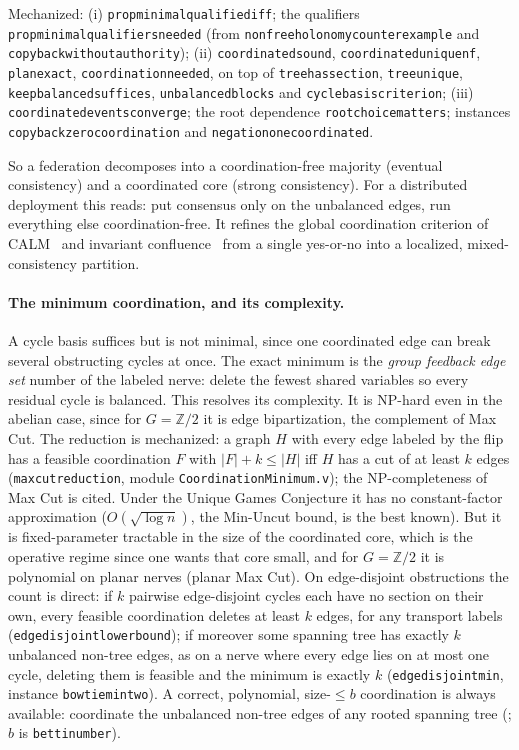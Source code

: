 \documentclass[11pt,a4paper]{article}
\theoremstyle{plain}
\theoremstyle{definition}
\theoremstyle{remark}
\renewcommand{\_}{\origunderscore\allowbreak}
\begin{document}
\noindent Mechanized: (i) \texttt{prop\_minimal\_qualified\_iff}; the qualifiers
\texttt{prop\_minimal\_qualifiers\_needed} (from \texttt{nonfree\_holonomy\_counterexample} and
\texttt{copyback\_without\_authority}); (ii) \texttt{coordinated\_sound},
\texttt{coordinated\_unique\_nf}, \texttt{plan\_exact}, \texttt{coordination\_needed}, on top of
\texttt{tree\_has\_section}, \texttt{tree\_unique}, \texttt{keep\_balanced\_suffices},
\texttt{unbalanced\_blocks} and \texttt{cycle\_basis\_criterion}; (iii)
\texttt{coordinated\_events\_converge}; the root dependence \texttt{root\_choice\_matters}; instances
\texttt{copyback\_zero\_coordination} and \texttt{negation\_one\_coordinated}.

So a federation decomposes into a coordination-free majority (eventual consistency) and a coordinated
core (strong consistency). For a distributed deployment this reads: put consensus only on the
unbalanced edges, run everything else coordination-free. It refines the global coordination criterion
of CALM~\cite{hellerstein2010declarative, ameloot2013relational} and invariant
confluence~\cite{bailis2014coordination} from a single yes-or-no into a localized, mixed-consistency
partition.

\paragraph{The minimum coordination, and its complexity.} A cycle basis suffices but is not minimal,
since one coordinated edge can break several obstructing cycles at once. The exact minimum is the
\emph{group feedback edge set} number of the labeled nerve: delete the fewest shared variables so
every residual cycle is balanced. This resolves its complexity. It is NP-hard even in the abelian
case, since for $G = \mathbb{Z}/2$ it is edge bipartization, the complement of Max Cut. The
reduction is mechanized: a graph $H$ with every edge labeled by the flip has a feasible coordination
$F$ with $|F| + k \le |H|$ iff $H$ has a cut of at least $k$ edges (\texttt{maxcut\_reduction},
module \texttt{CoordinationMinimum.v}); the NP-completeness of Max Cut is cited. Under the
Unique Games Conjecture it has no constant-factor approximation ($O(\sqrt{\log n})$, the Min-Uncut
bound, is the best known). But it is fixed-parameter tractable in the size of the coordinated core,
which is the operative regime since one wants that core small, and for $G = \mathbb{Z}/2$ it is
polynomial on planar nerves (planar Max Cut). On edge-disjoint obstructions the count is direct: if
$k$ pairwise edge-disjoint cycles each have no section on their own, every feasible coordination
deletes at least $k$ edges, for any transport labels (\texttt{edge\_disjoint\_lower\_bound}); if
moreover some spanning tree has exactly $k$ unbalanced non-tree edges, as on a nerve where every edge
lies on at most one cycle, deleting them is feasible and the minimum is exactly $k$
(\texttt{edge\_disjoint\_min}, instance \texttt{bowtie\_min\_two}). A correct, polynomial,
size-$\le b$ coordination is always available: coordinate the unbalanced non-tree edges of any rooted
spanning tree (; $b$ is \texttt{betti\_number}).
\end{document}
